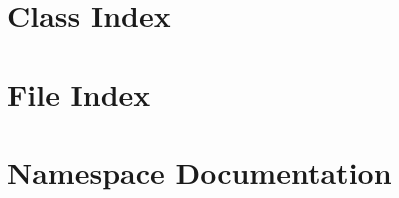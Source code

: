 \let\mypdfximage\pdfximage\def\pdfximage{\immediate\mypdfximage}\documentclass[twoside]{book}
\newcommand{\+}{\discretionary{\mbox{\scriptsize$\hookleftarrow$}}{}{}}
\begin{document}
\chapter{Class Index}

\chapter{File Index}

\chapter{Namespace Documentation}














\end{document}
